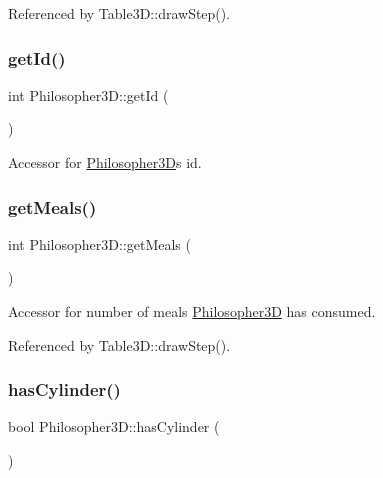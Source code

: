 Referenced by Table3\+D\+::draw\+Step().

\mbox{\label{class_philosopher3_d_aa1b77e0ee22ef9eb661cbc83b90d163b}} 
\subsubsection{\texorpdfstring{get\+Id()}{getId()}}
{\footnotesize\ttfamily int Philosopher3\+D\+::get\+Id (\begin{DoxyParamCaption}{ }\end{DoxyParamCaption})\hspace{0.3cm}{\ttfamily [inline]}}

Accessor for \hyperlink{class_philosopher3_d}{Philosopher3D}\textquotesingle{}s id. \mbox{\label{class_philosopher3_d_a7bff098afeb987e4fe4fab2dd6adcad6}} 
\subsubsection{\texorpdfstring{get\+Meals()}{getMeals()}}
{\footnotesize\ttfamily int Philosopher3\+D\+::get\+Meals (\begin{DoxyParamCaption}{ }\end{DoxyParamCaption})\hspace{0.3cm}{\ttfamily [inline]}}

Accessor for number of meals \hyperlink{class_philosopher3_d}{Philosopher3D} has consumed. 

Referenced by Table3\+D\+::draw\+Step().

\mbox{\label{class_philosopher3_d_a85edb411abaa49e0cc6fb8f8791bdb8b}} 
\subsubsection{\texorpdfstring{has\+Cylinder()}{hasCylinder()}}
{\footnotesize\ttfamily bool Philosopher3\+D\+::has\+Cylinder (\begin{DoxyParamCaption}{ }\end{DoxyParamCaption})\hspace{0.3cm}{\ttfamily [inline]}}

